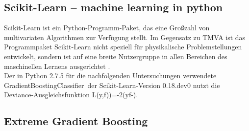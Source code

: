 \subsection{Scikit-Learn -- machine learning in python}
\label{ch:Algorithmen:subsec:sklearn}

Scikit-Learn ist ein Python-Programm-Paket, das eine Gro\ss zahl von multivariaten Algorithmen zur Verf\"ugung stellt. Im Gegensatz zu TMVA ist das Programmpaket Scikit-Learn nicht speziell f\"ur physikalische Problemstellungen entwickelt, sondern ist auf eine breite Nutzergruppe in allen Bereichen des maschinellen Lernens ausgerichtet \cite{DBLP:journals/corr/abs-1201-0490}.\\
Der in Python 2.7.5 f\"ur die nachfolgenden Untersuchungen verwendete \glqq GradientBoostingClassifier\grqq~der Scikit-Learn-Version 0.18.dev0 nutzt die \glqq Deviance\grqq-Ausgleichsfunktion
\beq
L\left(y,f)\right)=-2\left(y\cdot f-\right).
\label{eq:deviance}
\eeq

\subsection{Extreme Gradient Boosting}
\label{ch:Algorithmen:subsec:XGB}

